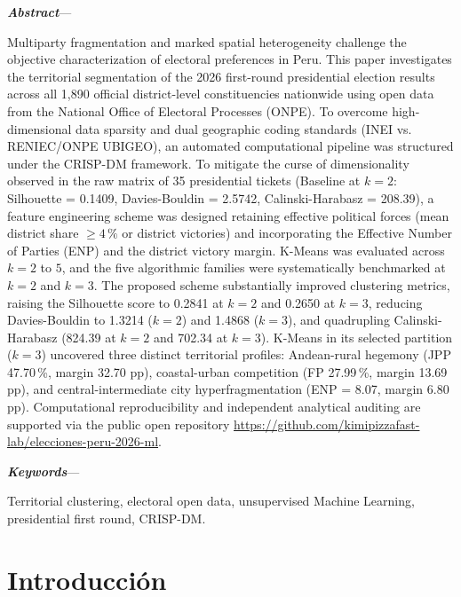 \documentclass[conference,10pt,letterpaper]{IEEEtran}
\makeatletter
\renewenvironment{abstract}{%
  \normalfont\@IEEEabskeysecsize
  \noindent\textbf{\textit{\abstractname}}---\relax
}{\par\normalfont\normalsize}
\renewenvironment{IEEEkeywords}{%
  \normalfont\@IEEEabskeysecsize
  \noindent\textbf{\textit{\IEEEkeywordsname}}---\relax
}{\par\normalfont\normalsize}
\makeatother
\begin{document}
\vspace{0.4em}

\renewcommand\abstractname{Abstract}
\renewcommand\IEEEkeywordsname{Keywords}
\begin{abstract}
Multiparty fragmentation and marked spatial heterogeneity challenge the objective characterization of electoral preferences in Peru. This paper investigates the territorial segmentation of the 2026 first-round presidential election results across all 1,890 official district-level constituencies nationwide using open data from the National Office of Electoral Processes (ONPE). To overcome high-dimensional data sparsity and dual geographic coding standards (INEI vs. RENIEC/ONPE UBIGEO), an automated computational pipeline was structured under the CRISP-DM framework. To mitigate the curse of dimensionality observed in the raw matrix of 35 presidential tickets (Baseline at $k = 2$: Silhouette = 0.1409, Davies-Bouldin = 2.5742, Calinski-Harabasz = 208.39), a feature engineering scheme was designed retaining effective political forces (mean district share $\ge 4\,\%$ or district victories) and incorporating the Effective Number of Parties (ENP) and the district victory margin. K-Means was evaluated across $k = 2$ to $5$, and the five algorithmic families were systematically benchmarked at $k = 2$ and $k = 3$. The proposed scheme substantially improved clustering metrics, raising the Silhouette score to 0.2841 at $k = 2$ and 0.2650 at $k = 3$, reducing Davies-Bouldin to 1.3214 ($k = 2$) and 1.4868 ($k = 3$), and quadrupling Calinski-Harabasz (824.39 at $k = 2$ and 702.34 at $k = 3$). K-Means in its selected partition ($k = 3$) uncovered three distinct territorial profiles: Andean-rural hegemony (JPP 47.70\,\%, margin 32.70 pp), coastal-urban competition (FP 27.99\,\%, margin 13.69 pp), and central-intermediate city hyperfragmentation (ENP = 8.07, margin 6.80 pp). Computational reproducibility and independent analytical auditing are supported via the public open repository \url{https://github.com/kimipizzafast-lab/elecciones-peru-2026-ml}.
\end{abstract}

\begin{IEEEkeywords}
Territorial clustering, electoral open data, unsupervised Machine Learning, presidential first round, CRISP-DM.
\end{IEEEkeywords}

\section{Introducción}
\end{document}
